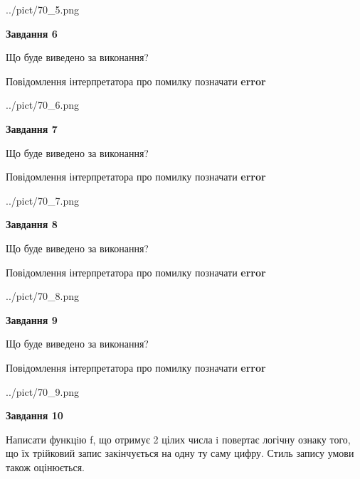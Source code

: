 \documentclass[12pt, ukrainian]{article}
\begin{document}
{\begin {large}
\begin{center}
	{../pict/70_5.png}
\end{center}
\newpage

{\begin {center}\textbf{Завдання 6}\end {center}}\par
Що буде виведено за виконання? \par
Повідомлення інтерпретатора про помилку позначати \textbf{error}

\begin{center}
	{../pict/70_6.png}
\end{center}
\newpage

{\begin {center}\textbf{Завдання 7}\end {center}}\par
Що буде виведено за виконання? \par
Повідомлення інтерпретатора про помилку позначати \textbf{error}

\begin{center}
	{../pict/70_7.png}
\end{center}
\newpage

{\begin {center}\textbf{Завдання 8}\end {center}}\par
Що буде виведено за виконання? \par
Повідомлення інтерпретатора про помилку позначати \textbf{error}

\begin{center}
	{../pict/70_8.png}
\end{center}
\newpage

{\begin {center}\textbf{Завдання 9}\end {center}}\par
Що буде виведено за виконання? \par
Повідомлення інтерпретатора про помилку позначати \textbf{error}

\begin{center}
	{../pict/70_9.png}
\end{center}
\newpage

{\begin {center}\textbf{Завдання 10}\end {center}}\par

Написати функцiю f, що отримує 2 цілих числа i повертає логічну ознаку того, що їх трійковий запис закінчується на одну ту саму цифру. Стиль запису умови також оцінюється.\par
\newpage

\end {large}}
\end{document}

